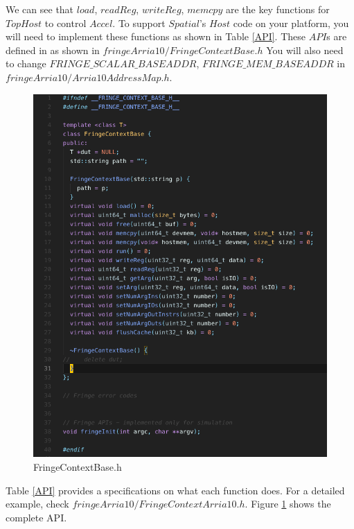 \documentclass{article}
\begin{document}
    We can see that $load$, $readReg$, $writeReg$, $memcpy$ are the key functions for $TopHost$ to control $Accel$.
    To support $Spatial$'s $Host$ code on your platform, you will need to implement these functions as shown in Table \ref{API}.
    These $API$s are defined in as shown in $fringeArria10/FringeContextBase.h$
    You will also need to change $FRINGE\_SCALAR\_BASEADDR$, $FRINGE\_MEM\_BASEADDR$ in $fringeArria10/Arria10AddressMap.h$.
    
    \begin{figure}
    \centering
    \includegraphics[scale=0.45]{fringecontext.png}
    \caption{FringeContextBase.h}
    \label{fig:fringecontextbase}
    \end{figure}
    
    Table \ref{API} provides a specifications on what each function does.
    For a detailed example, check $fringeArria10/FringeContextArria10.h$.
    Figure \ref{fig:fringecontextbase} shows the complete API.
    
\end{document}
